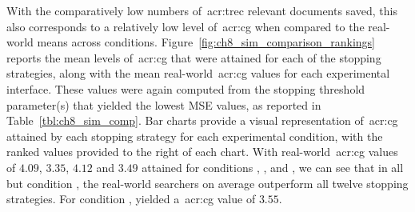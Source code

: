 With the comparatively low numbers of~\gls{acr:trec} relevant documents saved, this also corresponds to a relatively low level of~\gls{acr:cg} when compared to the real-world means across conditions. Figure~\ref{fig:ch8_sim_comparison_rankings} reports the mean levels of~\gls{acr:cg} that were attained for each of the stopping strategies, along with the mean real-world~\gls{acr:cg} values for each experimental interface. These values were again computed from the stopping threshold parameter(s) that yielded the lowest MSE values, as reported in Table~\ref{tbl:ch8_sim_comp}. Bar charts provide a visual representation of~\gls{acr:cg} attained by each stopping strategy for each experimental condition, with the ranked values provided to the right of each chart. With real-world~\gls{acr:cg} values of $4.09$, $3.35$, $4.12$ and $3.49$ attained for conditions , ,  and , we can see that in all but condition , the real-world searchers on average outperform all twelve stopping strategies. For condition ,  yielded a~\gls{acr:cg} value of $3.55$.

